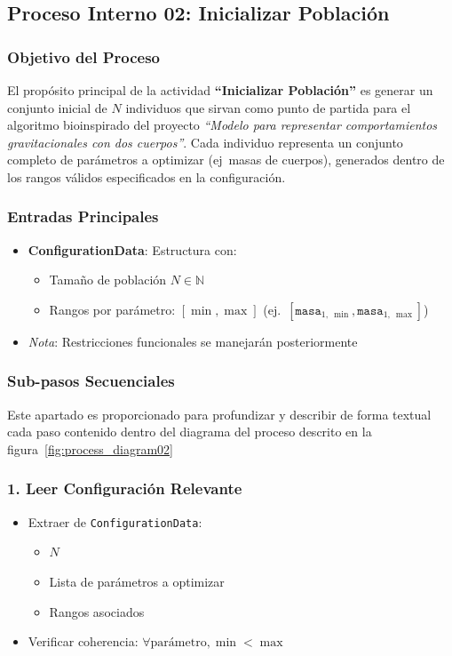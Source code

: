 \subsection{Proceso Interno 02: Inicializar Población}

\subsubsection{Objetivo del Proceso}
El propósito principal de la actividad \textbf{``Inicializar Población''} es generar un conjunto inicial de $N$ individuos que sirvan como punto de partida para el algoritmo bioinspirado del proyecto \textit{``Modelo para representar comportamientos gravitacionales con dos cuerpos''}. Cada individuo representa un conjunto completo de parámetros a optimizar (ej\ masas de cuerpos), generados dentro de los rangos válidos especificados en la configuración.

\subsubsection{Entradas Principales}
\begin{itemize}
    \item \textbf{ConfigurationData}: Estructura con:
    \begin{itemize}
        \item Tamaño de población $N \in \mathbb{N}$
        \item Rangos por parámetro: $[\min, \max]$ (ej.\ $[\texttt{masa}_{1,~\min}, \texttt{masa}_{1,~\max}]$)
    \end{itemize}
    \item \textit{Nota}: Restricciones funcionales se manejarán posteriormente
\end{itemize}
\subsubsection{Sub-pasos Secuenciales}
Este apartado es proporcionado para profundizar y describir de forma textual cada paso contenido dentro del diagrama del proceso descrito en la figura~\ref{fig:process_diagram02}
\subsubsection*{1. Leer Configuración Relevante}
\begin{itemize}
    \item Extraer de \texttt{ConfigurationData}:
    \begin{itemize}
        \item $N$
        \item Lista de parámetros a optimizar
        \item Rangos asociados
    \end{itemize}
    \item Verificar coherencia: $\forall \text{parámetro}, \min < \max$
\end{itemize}

